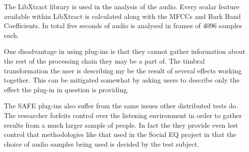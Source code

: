			The LibXtract library \citep{bullock2007libxtract} is used in the analysis of the audio. Every
			scalar feature available within LibXtract is calculated along with the MFCCs and Bark Band
			Coefficients. In total five seconds of audio is analysed in frames of 4096 samples each.


			One disadvantage in using plug-ins is that they cannot gather information about the rest of the
			processing chain they may be a part of. The timbral transformation the user is describing my be the
			result of several effects working together. This can be mitigated somewhat by asking users to
			describe only the effect the plug-in in question is providing.

			The SAFE plug-ins also suffer from the same issues other distributed tests do. The researcher
			forfeits control over the listening environment in order to gather results from a much larger sample
			of people. In fact the they provide even lest control that methodologies like that used in the
			Social EQ project \citep{cartwright2013socialeq} in that the choice of audio samples being used is
			decided by the test subject. 
